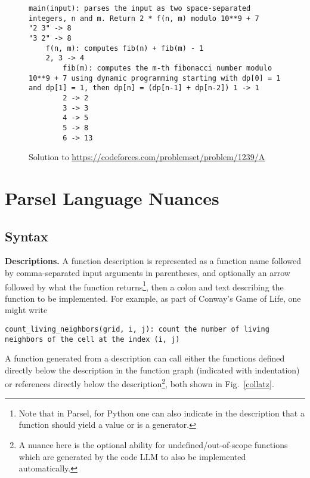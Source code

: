 \begin{figure*}
\begin{lstlisting}
main(input): parses the input as two space-separated integers, n and m. Return 2 * f(n, m) modulo 10**9 + 7
"2 3" -> 8
"3 2" -> 8
    f(n, m): computes fib(n) + fib(m) - 1
    2, 3 -> 4
        fib(m): computes the m-th fibonacci number modulo 10**9 + 7 using dynamic programming starting with dp[0] = 1 and dp[1] = 1, then dp[n] = (dp[n-1] + dp[n-2]) 1 -> 1
        2 -> 2
        3 -> 3
        4 -> 5
        5 -> 8
        6 -> 13
\end{lstlisting}
\caption{Solution to \url{https://codeforces.com/problemset/problem/1239/A}}
\end{figure*}

\clearpage
\newpage
\section{Parsel Language Nuances}
\label{nuances}
\subsection{Syntax}
\textbf{Descriptions.}
A function description is represented as a function name followed by comma-separated input arguments in parentheses, and optionally an arrow followed by what the function returns\footnote{Note that in Parsel, for Python one can also indicate in the description that a function should yield a value or is a generator.}, then a colon and text describing the function to be implemented. For example, as part of Conway's Game of Life, one might write  

\begin{lstlisting}[breaklines=true,numbers=none]
count_living_neighbors(grid, i, j): count the number of living neighbors of the cell at the index (i, j)
\end{lstlisting}
A function generated from a description can call either the functions defined directly below the description in the function graph (indicated with indentation) or references directly below the description\footnote{A nuance here is the optional ability for undefined/out-of-scope functions which are generated by the code LLM to also be implemented automatically.}, both shown in Fig.~\ref{collatz}.


